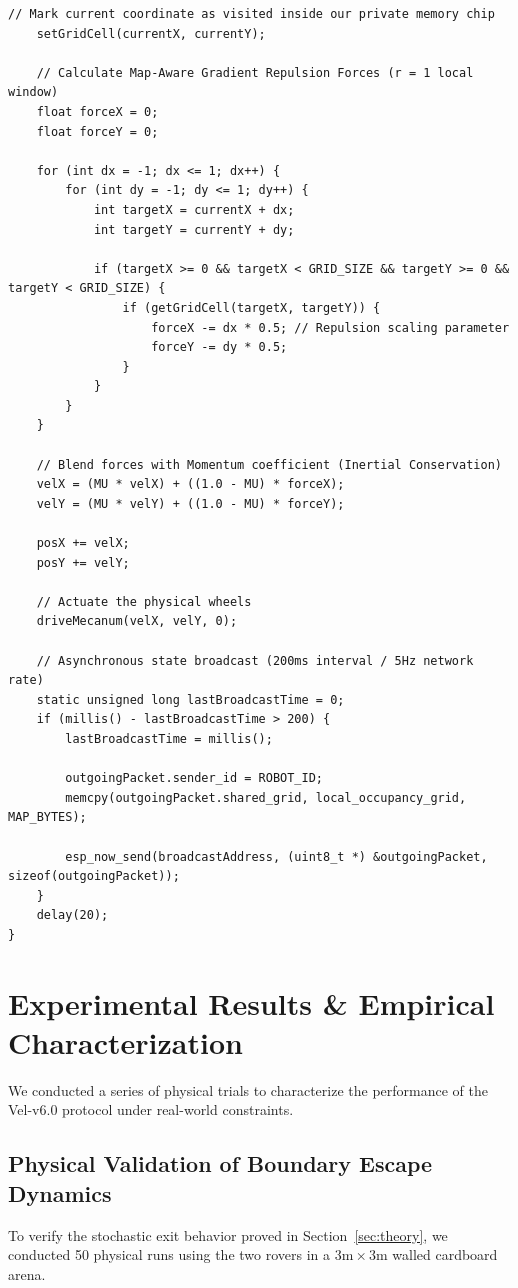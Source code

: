 \documentclass[letterpaper, 10pt, conference]{IEEEtran}
\begin{document}
\begin{lstlisting}[caption={Vel-v6.0 Distributed State Replication Firmware}, label={lst:firmware}]
    // Mark current coordinate as visited inside our private memory chip
    setGridCell(currentX, currentY);

    // Calculate Map-Aware Gradient Repulsion Forces (r = 1 local window)
    float forceX = 0;
    float forceY = 0;
    
    for (int dx = -1; dx <= 1; dx++) {
        for (int dy = -1; dy <= 1; dy++) {
            int targetX = currentX + dx;
            int targetY = currentY + dy;
            
            if (targetX >= 0 && targetX < GRID_SIZE && targetY >= 0 && targetY < GRID_SIZE) {
                if (getGridCell(targetX, targetY)) {
                    forceX -= dx * 0.5; // Repulsion scaling parameter
                    forceY -= dy * 0.5;
                }
            }
        }
    }

    // Blend forces with Momentum coefficient (Inertial Conservation)
    velX = (MU * velX) + ((1.0 - MU) * forceX);
    velY = (MU * velY) + ((1.0 - MU) * forceY);

    posX += velX;
    posY += velY;

    // Actuate the physical wheels
    driveMecanum(velX, velY, 0);

    // Asynchronous state broadcast (200ms interval / 5Hz network rate)
    static unsigned long lastBroadcastTime = 0;
    if (millis() - lastBroadcastTime > 200) {
        lastBroadcastTime = millis();
        
        outgoingPacket.sender_id = ROBOT_ID;
        memcpy(outgoingPacket.shared_grid, local_occupancy_grid, MAP_BYTES);
        
        esp_now_send(broadcastAddress, (uint8_t *) &outgoingPacket, sizeof(outgoingPacket));
    }
    delay(20); 
}
\end{lstlisting}

\section{Experimental Results \& Empirical Characterization}
\label{sec:results}

We conducted a series of physical trials to characterize the performance of the Vel-v6.0 protocol under real-world constraints.

\subsection{Physical Validation of Boundary Escape Dynamics}
To verify the stochastic exit behavior proved in Section~\ref{sec:theory}, we conducted 50 physical runs using the two rovers in a $3\text{m} \times 3\text{m}$ walled cardboard arena.
\end{document}
